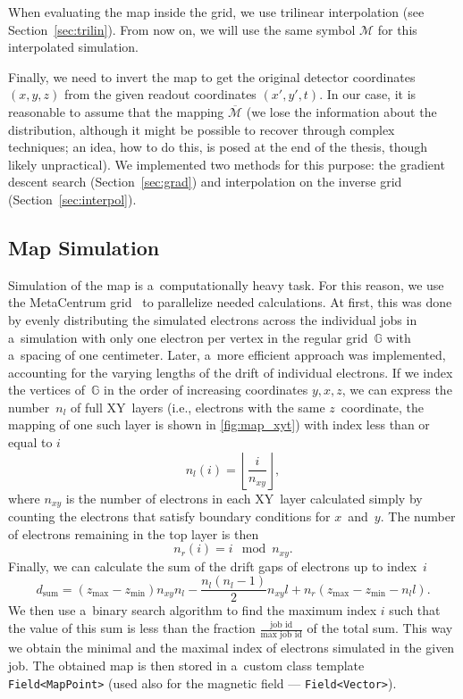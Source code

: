 		When evaluating the map inside the grid, we use trilinear interpolation (see Section~\ref{sec:trilin}). From now on, we will use the same symbol $\mathcal{M}$ for this interpolated simulation.
		
		Finally, we need to invert the map to get the original detector coordinates $(x,y,z)$ from the given readout coordinates $(x',y',t)$. In our case, it is reasonable to assume that the mapping $\overline{\mathcal{M}}$ (we lose the information about the distribution, although it might be possible to recover through complex techniques; an idea, how to do this, is posed at the end of the thesis, though likely unpractical). We implemented two methods for this purpose: the gradient descent search (Section~\ref{sec:grad}) and interpolation on the inverse grid (Section~\ref{sec:interpol}).
		
		\subsection{Map Simulation}
			Simulation of the map is a~computationally heavy task. For this reason, we use the MetaCentrum grid~\cite{metacentrum} to parallelize needed calculations. At first, this was done by evenly distributing the simulated electrons across the individual jobs in a~simulation with only one electron per vertex in the regular grid~$\mathbb{G}$ with a~spacing of one centimeter. Later, a~more efficient approach was implemented, accounting for the varying lengths of the drift of individual electrons. If we index the vertices of~$\mathbb{G}$ in the order of increasing coordinates $y,x,z$, we can express the number~$n_l$ of full XY~layers (i.e., electrons with the same $z$~coordinate, the mapping of one such layer is shown in \cref{fig:map_xyt}) with index less than or equal to $i$
				\begin{equation}
					n_l(i) = \left\lfloor\frac{i}{n_{xy}}\right\rfloor,
				\end{equation}
			where $n_{xy}$ is the number of electrons in each XY~layer calculated simply by counting the electrons that satisfy boundary conditions for $x$~and~$y$. The number of electrons remaining in the top layer is then
				\begin{equation}
					n_r(i) = i\!\!\!\!\mod n_{xy}.
				\end{equation}
			Finally, we can calculate the sum of the drift gaps of electrons up to index~$i$
				\begin{equation}
					d_\text{sum} = (z_\text{max}-z_\text{min})n_{xy}n_l-\frac{n_l(n_l-1)}{2}n_{xy}l+n_r(z_\text{max}-z_\text{min}-n_l l).
				\end{equation}
			We then use a~binary search algorithm to find the maximum index $i$ such that the value of this sum is less than the fraction $\frac{\text{job id}}{\text{max job id}}$ of the total sum. This way we obtain the minimal and the maximal index of electrons simulated in the given job. The obtained map is then stored in a~custom class template \texttt{Field<MapPoint>} (used also for the magnetic field --- \texttt{Field<Vector>}).
		
